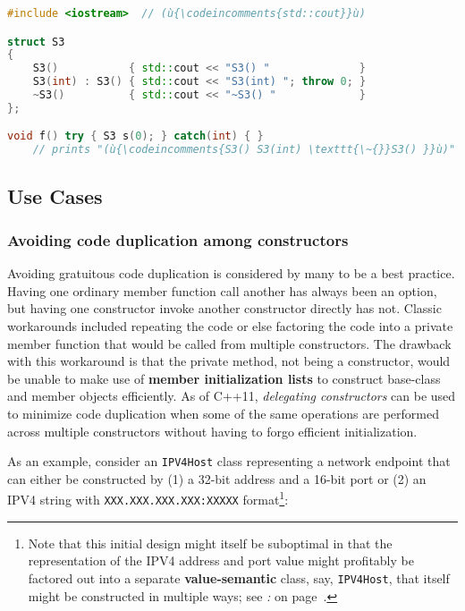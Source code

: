 \begin{lstlisting}[language=C++]
#include <iostream>  // (ù{\codeincomments{std::cout}}ù)

struct S3
{
    S3()           { std::cout << "S3() "              }
    S3(int) : S3() { std::cout << "S3(int) "; throw 0; }
    ~S3()          { std::cout << "~S3() "             }
};

void f() try { S3 s(0); } catch(int) { }
    // prints "(ù{\codeincomments{S3() S3(int) \texttt{\~{}}S3() }}ù)" to (ù{\codeincomments{stdout}}ù)
\end{lstlisting}
    

\subsection[Use Cases]{Use Cases}\label{ctordelegating-use-cases}

\subsubsection[Avoiding code duplication among constructors]{Avoiding code duplication among constructors}\label{avoiding-code-duplication-among-constructors}

Avoiding gratuitous code duplication is considered by many to be a best
practice. Having one ordinary member function call another has always
been an option, but having one constructor invoke another constructor
directly has not. Classic workarounds included repeating the code or
else factoring the code into a private member function that would be
called from multiple constructors. The drawback with this workaround is
that the private method, not being a constructor, would be unable to
make use of \textbf{member initialization lists} to construct base-class
and member objects efficiently. As of C++11, \emph{delegating
constructors} can be used to minimize code duplication when some of
the same operations are performed across multiple constructors without
having to forgo efficient initialization.

As an example, consider an \texttt{IPV4Host} class representing a
network endpoint that can either be constructed by (1) a 32-bit address
and a 16-bit port or (2) an IPV4 string with
\texttt{XXX.XXX.XXX.XXX:XXXXX} format{\cprotect\footnote{Note that
this initial design might itself be suboptimal in that the
representation of the IPV4 address and port value might profitably be
factored out into a separate \textbf{value-semantic} class, say,
\texttt{IPV4Host}, that itself might be constructed in multiple ways;
  see {\it{}:} {\it{}} on page~\pageref{suboptimal-factoring}.}}:


